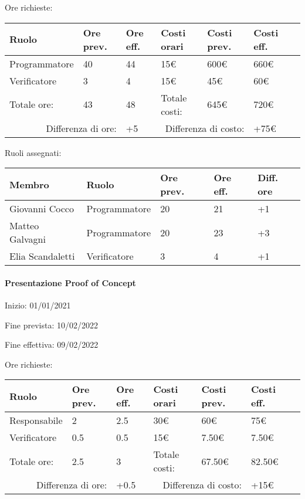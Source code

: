 \documentclass[a4paper, 12pt]{article}
\begin{document}
Ore richieste:\\[0.5em]
\begin{tabular}{|l|l|l||l|l|l|l|}\hline
Ruolo & Ore prev. & Ore eff. & Costi orari & Costi prev. & Costi eff.\\\hline
Programmatore & 40 & 44 & 15\euro & 600\euro & 660\euro \\\hline
Verificatore & 3 & 4 & 15\euro & 45\euro & 60\euro \\\hline
Totale ore: & 43 & 48 & Totale costi: & 645\euro & 720\euro \\\hline
\multicolumn{2}{|r|}{Differenza di ore:} & +5 & \multicolumn{2}{r|}{Differenza di costo:} & +75\euro \\\hline
\end{tabular}

Ruoli assegnati:\\[0.5em]
\begin{tabular}{|l|l|l|l|l|}\hline
Membro & Ruolo & Ore prev. & Ore eff. & Diff. ore \\\hline
Giovanni Cocco & Programmatore & 20 & 21 & +1 \\\hline
Matteo Galvagni & Programmatore & 20 & 23 & +3 \\\hline
Elia Scandaletti & Verificatore & 3 & 4 & +1 \\\hline
\end{tabular}

\paragraph{Presentazione Proof of Concept}
Inizio: 01/01/2021\par
Fine prevista: 10/02/2022\par
Fine effettiva: 09/02/2022

Ore richieste:\\[0.5em]
\begin{tabular}{|l|l|l||l|l|l|l|}\hline
Ruolo & Ore prev. & Ore eff. & Costi orari & Costi prev. & Costi eff.\\\hline
Responsabile & 2 & 2.5 & 30\euro & 60\euro & 75\euro \\\hline
Verificatore & 0.5 & 0.5 & 15\euro & 7.50\euro & 7.50\euro \\\hline
Totale ore: & 2.5 & 3 & Totale costi: & 67.50\euro & 82.50\euro \\\hline
\multicolumn{2}{|r|}{Differenza di ore:} & +0.5 & \multicolumn{2}{r|}{Differenza di costo:} & +15\euro \\\hline
\end{tabular}
\end{document}
